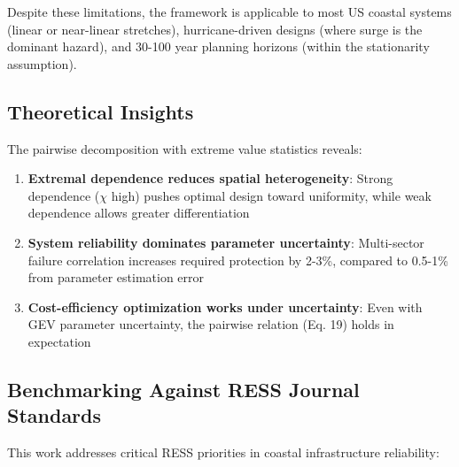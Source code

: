 \documentclass[review]{elsarticle}
\begin{document}
Despite these limitations, the framework is applicable to most US coastal systems (linear or near-linear stretches), hurricane-driven designs (where surge is the dominant hazard), and 30-100 year planning horizons (within the stationarity assumption).

\subsection{Theoretical Insights}

The pairwise decomposition with extreme value statistics reveals:

\begin{enumerate}
\item \textbf{Extremal dependence reduces spatial heterogeneity}: Strong dependence ($\chi$ high) pushes optimal design toward uniformity, while weak dependence allows greater differentiation

\item \textbf{System reliability dominates parameter uncertainty}: Multi-sector failure correlation increases required protection by 2-3\%, compared to 0.5-1\% from parameter estimation error

\item \textbf{Cost-efficiency optimization works under uncertainty}: Even with GEV parameter uncertainty, the pairwise relation (Eq. 19) holds in expectation

\end{enumerate}

\subsection{Benchmarking Against RESS Journal Standards}

This work addresses critical RESS priorities in coastal infrastructure reliability:
\end{document}
